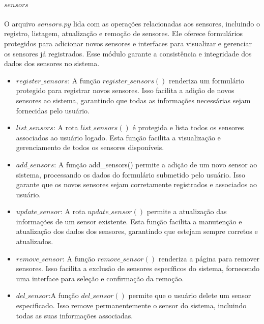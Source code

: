 \documentclass[conference, a4paper, 12pt]{IEEEtran}
\begin{document}
      \paragraph{$sensors$}
      O arquivo $sensors.py$ lida com as operações relacionadas aos sensores, incluindo o registro, listagem, atualização e remoção de sensores. Ele oferece formulários protegidos para adicionar novos sensores e interfaces para visualizar e gerenciar os sensores já registrados. Esse módulo garante a consistência e integridade dos dados dos sensores no sistema.
      
      \begin{itemize}
          \item $register\_sensors$: A função $register\_sensors()$ renderiza um formulário protegido para registrar novos sensores. Isso facilita a adição de novos sensores ao sistema, garantindo que todas as informações necessárias sejam fornecidas pelo usuário.
      
          \item $list\_sensors$: A rota $list\_sensors()$ é protegida e lista todos os sensores associados ao usuário logado. Esta função facilita a visualização e gerenciamento de todos os sensores disponíveis.
      
          \item $add\_sensors$: A função add_sensors() permite a adição de um novo sensor ao sistema, processando os dados do formulário submetido pelo usuário. Isso garante que os novos sensores sejam corretamente registrados e associados ao usuário.
      
          \item $update\_sensor$: A rota $update\_sensor()$ permite a atualização das informações de um sensor existente. Esta função facilita a manutenção e atualização dos dados dos sensores, garantindo que estejam sempre corretos e atualizados.
      
          \item $remove\_sensor$: A função $remove\_sensor()$ renderiza a página para remover sensores. Isso facilita a exclusão de sensores específicos do sistema, fornecendo uma interface para seleção e confirmação da remoção.
      
          \item $del\_sensor$:A função $del\_sensor()$ permite que o usuário delete um sensor especificado. Isso remove permanentemente o sensor do sistema, incluindo todas as suas informações associadas.
          
      \end{itemize}
      
\end{document}
